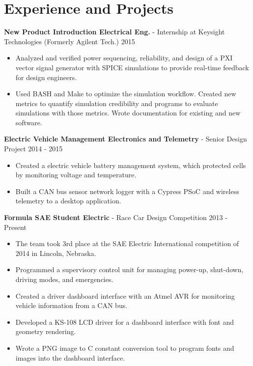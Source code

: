\documentclass[10pt]{article}
\begin{document}
\section{Experience and Projects}
\begin{adjustwidth}{16pt}{0pt}

\noindent\textbf{New Product Introduction Electrical Eng.} - Internship at
Keysight Technologies (Formerly Agilent Tech.)
\hfill 2015
\begin{itemize}
	\setlength\itemsep{0pt}
	\item Analyzed and verified power sequencing, reliability, and design of a PXI
	vector signal generator with SPICE simulations to provide real-time feedback
	for design engineers.
	\item Used BASH and Make to optimize the simulation workflow. Created new
	metrics to quantify simulation credibility and programs to evaluate
	simulations with those metrics. Wrote documentation for existing and new
	software.
\end{itemize}


\vspace{8pt}
\noindent\textbf{Electric Vehicle Management Electronics and Telemetry} - Senior Design Project
\hfill 2014 - 2015
\begin{itemize}
	\setlength\itemsep{0pt}
	\item Created a electric vehicle battery management system, which protected
	cells by monitoring voltage and temperature.
	\item Built a CAN bus sensor network logger with a Cypress PSoC and wireless
	telemetry to a desktop application.
\end{itemize}



\vspace{8pt}
\noindent\textbf{Formula SAE Student Electric} - Race Car Design Competition
\hfill 2013 - Present
\begin{itemize}
	\setlength\itemsep{0pt}
	\item The team took 3rd place at the SAE Electric International competition of
	2014 in Lincoln, Nebraska.
	\item Programmed a supervisory control unit for managing power-up, shut-down,
	driving modes, and emergencies.
	\item Created a driver dashboard interface with an Atmel AVR for monitoring
	vehicle information from a CAN bus.
	\item Developed a KS-108 LCD driver for a dashboard interface with font and
	geometry rendering.
	\item Wrote a PNG image to C constant conversion tool to program fonts and
	images into the dashboard interface. 
\end{itemize}



\end{adjustwidth}
\end{document}
